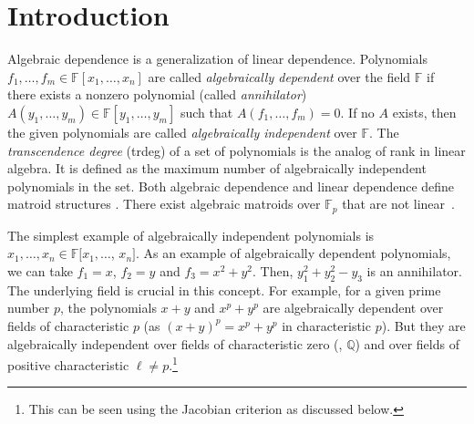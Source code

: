 \documentclass{toc}
\newcommand{\F}{\mathbb{F}}
\begin{document}
\begin{frontmatter}
%
%
%
%
%
%
%
%
%
%
%
%
%
%
%
%
%
%
%
%
%
%
%
%
%
%
%
%
%


%
%
%
%
%
%
%
%
%
%
%

%

\end{frontmatter}




\section{Introduction}
%

Algebraic dependence is a generalization of linear dependence. Polynomials $f_1,\ldots ,f_m \in \F[x_1, \ldots ,x_n]$ are called \emph{algebraically dependent} over
the  %
field $\F$ if there exists a nonzero polynomial (called \emph{annihilator}) $A(y_1,\ldots ,y_m)\in \F[y_1,\ldots ,y_m]$ such that $A(f_1,\ldots,f_m)=0$. If no $A$ exists, then the given polynomials are called \emph{algebraically independent} over $\F$. The \emph{transcendence degree} (trdeg) of a set of polynomials is the analog of rank in linear algebra. It is defined as the
%
maximum   %
number of algebraically independent polynomials in the set. Both algebraic dependence and linear dependence
%
%
define matroid structures  %
\cite{ehrenborg1993apolarity}.
%
There exist algebraic matroids over $\F_p$ that are not
linear~\cite{ingleton1971representation}.   %

The simplest
%
example
of algebraically independent polynomials
%
is
$x_1,\ldots,x_n \in \F[x_1, \ldots$, $x_n] $. As an example of algebraically dependent polynomials, we can take $f_1=x$, $f_2=y$ and $f_3=x^2+y^2$. Then, $y_1^2 + y_2^2-y_3$ is an annihilator. The underlying field is crucial in this concept.
%
For example, for a given prime number $p$, the polynomials $x+y$ and $x^p + y^p$ are algebraically dependent over fields of characteristic $p$ (as $(x+y)^p=x^p+y^p$ in characteristic $p$).
But they are algebraically independent over fields of characteristic zero (\eg, $\mathbb{Q}$) %
and over fields of positive characteristic $\ell\neq p$.\footnote{This can be seen using the Jacobian criterion \cite{Jac41, BMS13} as discussed below.} %
\end{document}
